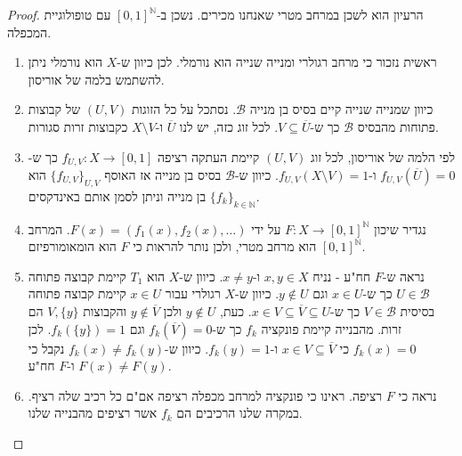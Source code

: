\documentclass{tstextbook}
\begin{document}
\begin{proof}
הרעיון הוא לשכן במרחב מטרי שאנחנו מכירים. נשכן ב-\([0,1]^{\mathbb{N}}\) עם טופולוגיית המכפלה.

  \begin{enumerate}
    \item ראשית נזכור כי מרחב רגולרי ומנייה שנייה הוא נורמלי. לכן כיוון ש-\(X\) הוא נורמלי ניתן להשתמש בלמה של אוריסון. 


    \item כיוון שמנייה שנייה קיים בסיס בן מנייה \(\mathcal{B}\). נסתכל על כל הזוגות \((U,V)\) של קבוצות פתוחות מהבסיס \(\mathcal{B}\) כך ש-\(V\subseteq\overline{U}\). לכל זוג כזה, יש לנו \(\overline{U}\) ו-\(X\setminus V\) כקבוצות זרות סגורות. 


    \item לפי הלמה של אוריסון, לכל זוג \((U,V)\) קיימת העתקה רציפה \(f_{U,V}:X\to[0,1]\) כך ש-\(f_{U,V}\left( \overline{U} \right)=0\) ו-\(f_{U,V}\left( X\setminus V \right)=1\). כיוון ש-\(\mathcal{B}\) בסיס בן מנייה אז האוסף \(\{ f_{U,V} \}_{U,V}\) הוא בן מנייה וניתן לסמן אותם באינדקסים \(\{ f_{k} \}_{k \in \mathbb{N}}\). 


    \item נגדיר שיכון \(F:X\to [0,1]^{\mathbb{N}}\) על ידי \(F(x)=\left( f_{1}(x),f_{2}(x),\dots \right)\). המרחב \([0,1]^{\mathbb{N}}\) הוא מרחב מטרי, ולכן נותר להראות כי \(F\) הוא הומאומורפיזם. 


    \item נראה ש-\(F\) חח"ע - נניח \(x,y \in X\) ו-\(x \neq y\). כיוון ש-\(X\) הוא \(T_{1}\) קיימת קבוצה פתוחה \(U \in \mathcal{B}\) כך ש-\(x \in U\) וגם \(y \not \in U\). כיוון ש-\(X\) רגולרי עבור \(x \in U\) קיימת קבוצה פתוחה בסיסית \(V \in \mathcal{B}\) כך ש-\(x \in V \subseteq \overline{V}\subseteq U\). כעת, \(y\not \in U\) ולכן \(y \not \in \overline{V}\) והקבוצות \(V,\{ y \}\) הם זרות. מהבנייה קיימת פונקציה \(f_{k}\) כך ש-\(f_{k}\left( \overline{V} \right)=0\) וגם \(f_{k}\left( \{ y \} \right)=1\). לכן \(f_{k}(x)=0\) כי \(x \in V\subseteq \overline{V}\) ו-\(f_{k}(y)=1\). כיוון ש-\(f_{k}(x)\neq f_{k}(y)\) נקבל כי \(F(x)\neq F(y)\) ו-\(F\) חח"ע. 


    \item נראה כי \(F\) רציפה. ראינו כי פונקציה למרחב מכפלה רציפה אם"ם כל רכיב שלה רציף. במקרה שלנו הרכיבים הם \(f_{k}\) אשר רציפים מהבנייה שלנו. 



\end{enumerate}
\end{proof}
\end{document}
